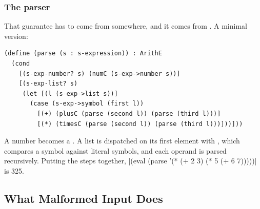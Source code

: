 \subsubsection{The parser} That guarantee has to come from somewhere, and it comes from . A minimal version:
\begin{lstlisting}
(define (parse (s : s-expression)) : ArithE
  (cond
    [(s-exp-number? s) (numC (s-exp->number s))]
    [(s-exp-list? s)
     (let [(l (s-exp->list s))]
       (case (s-exp->symbol (first l))
         [(+) (plusC (parse (second l)) (parse (third l)))]
         [(*) (timesC (parse (second l)) (parse (third l)))]))]))
\end{lstlisting}
A number becomes a . A list is dispatched on its first element with , which compares a symbol against literal symbols, and each operand is parsed recursively. Putting the steps together, \rkt|(eval (parse '(* (+ 2 3) (* 5 (+ 6 7)))))| is 325.

\subsection{What Malformed Input Does}

